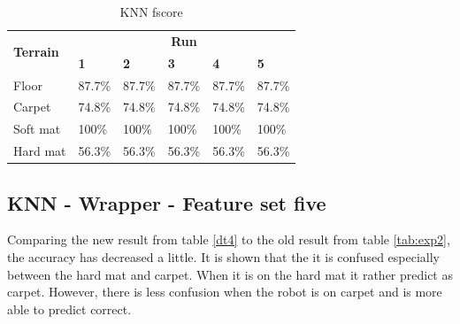 \documentclass[USenglish]{ifimaster}  %
\begin{document}
	\begin{table}[h]
		\centering
		\begin{tabular}{@{}llllll@{}}
			\toprule
			\multirow{2}{*}{\textbf{Terrain}} & \multicolumn{5}{c}{\textbf{Run}} \\ \cmidrule(l){2-6} 
			& \multicolumn{1}{l|}{\textbf{1}} & \multicolumn{1}{l|}{\textbf{2}} & \multicolumn{1}{l|}{\textbf{3}} & \multicolumn{1}{l|}{\textbf{4}} & \textbf{5} \\ \midrule
			\multicolumn{1}{l|}{Floor} & \multicolumn{1}{l|}{87.7\%} & \multicolumn{1}{l|}{87.7\%} & \multicolumn{1}{l|}{87.7\%} & \multicolumn{1}{l|}{87.7\%} & 87.7\% \\ \midrule
			\multicolumn{1}{l|}{Carpet} & \multicolumn{1}{l|}{74.8\%} & \multicolumn{1}{l|}{74.8\%} & \multicolumn{1}{l|}{74.8\%} & \multicolumn{1}{l|}{74.8\%} & 74.8\% \\ \midrule
			\multicolumn{1}{l|}{Soft mat} & \multicolumn{1}{l|}{100\%} & \multicolumn{1}{l|}{100\%} & \multicolumn{1}{l|}{100\%} & \multicolumn{1}{l|}{100\%} & 100\% \\ \midrule
			\multicolumn{1}{l|}{Hard mat} & \multicolumn{1}{l|}{56.3\%} & \multicolumn{1}{l|}{56.3\%} & \multicolumn{1}{l|}{56.3\%} & \multicolumn{1}{l|}{56.3\%} & 56.3\% \\ \bottomrule
		\end{tabular}
		\caption{KNN fscore}
		\label{knnfscore}
	\end{table}
	\FloatBarrier
	
	\subsection{KNN - Wrapper - Feature set five}
	Comparing the new result from table \ref{dt4} to the old result from table \ref{tab:exp2}, the accuracy has decreased a little. It is shown that the it is confused especially between the hard mat and carpet. When it is on the hard mat it rather predict as carpet. However, there is less confusion when the robot is on carpet and is more able to predict correct.
	
	
\end{document}
